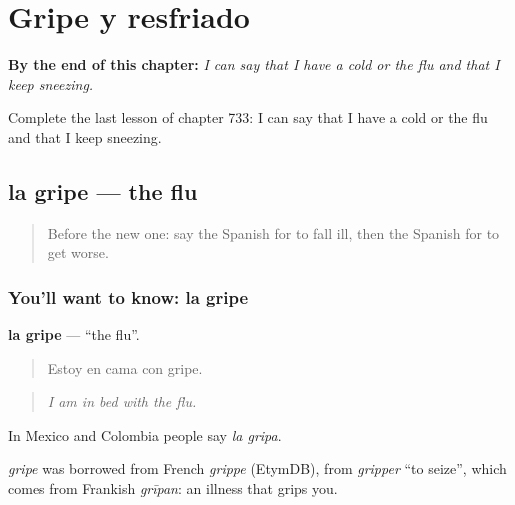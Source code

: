 
\chapter{Gripe y resfriado}
\label{ch:es-gripe-y-resfriado}

\begin{chapteropening}
\textbf{By the end of this chapter:} \emph{I can say that I have a cold or the flu and that I keep sneezing.}

Complete the last lesson of chapter 733: I can say that I have a cold or the flu and that I keep sneezing.
\end{chapteropening}

\section[la gripe]{la gripe — the flu}

\label{lesson:ES-C733-gripe}



\begin{quote}
Before the new one: say the Spanish for to fall ill, then the Spanish for to get worse.
\end{quote}

\subsection*{You'll want to know: la gripe}
\textbf{la gripe} — \textquotedblleft{}the flu\textquotedblright{}.

\begin{quote}
Estoy en cama con gripe.
\end{quote}

\begin{quote}
\emph{I am in bed with the flu.}
\end{quote}

In Mexico and Colombia people say \emph{la gripa}.

\begin{cousinweb}
\emph{gripe} was borrowed from French \emph{grippe} (EtymDB), from \emph{gripper} \textquotedblleft{}to seize\textquotedblright{}, which comes from Frankish \emph{grīpan}: an illness that grips you.
\end{cousinweb}

